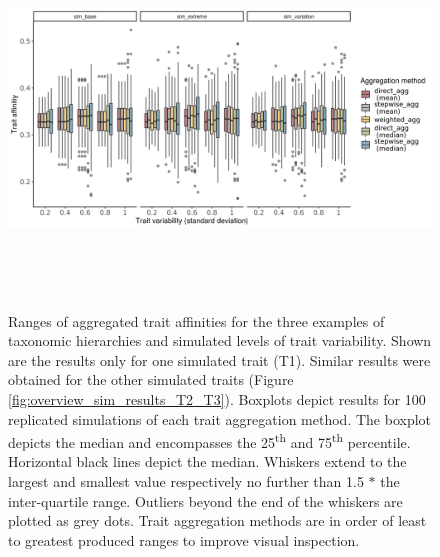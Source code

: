 \documentclass[12pt]{article}
\begin{document}
\begin{figure}[H]
  \centering
  \includegraphics[width=16.5cm, height=10cm]{Overview_sim_results.png}
  \caption{Ranges of aggregated trait affinities for the three examples of taxonomic hierarchies and simulated levels of trait variability. Shown are the results only for one simulated trait (T1). Similar results were obtained for the other simulated traits (Figure \ref{fig:overview_sim_results_T2_T3}). Boxplots depict results for 100 replicated simulations of each trait aggregation method. The boxplot depicts the median and encompasses the 25\textsuperscript{th} and 75\textsuperscript{th} percentile. Horizontal black lines depict the median. Whiskers extend to the largest and smallest value respectively no further than 1.5 $*$ the inter-quartile range. Outliers beyond the end of the whiskers are plotted as grey dots. Trait aggregation methods are in order of least to greatest produced ranges to improve visual inspection.}
  \label{fig:overview_sim_results}
\end{figure}
\end{document}
